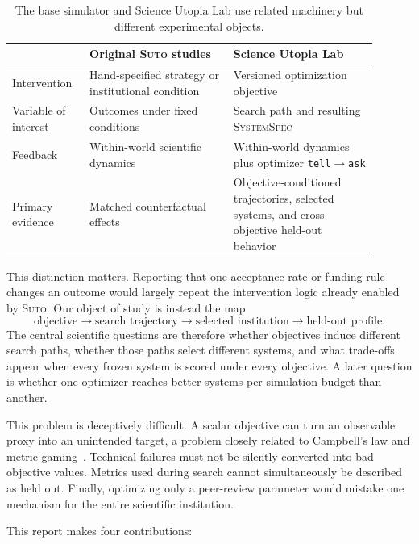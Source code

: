 \documentclass{article}
\newcommand{\systemspec}{\textsc{SystemSpec}}
\newcommand{\suto}{\textsc{Suto}}
\newcommand{\code}[1]{\texttt{#1}}
\begin{document}
\begin{table}[t]
\caption{The base simulator and Science Utopia Lab use related machinery but different experimental objects.}
\label{tab:suto-vs-lab}
\centering
\small
\begin{tabular}{p{0.18\linewidth}p{0.36\linewidth}p{0.36\linewidth}}
\toprule
 & Original \suto{} studies & Science Utopia Lab \\
\midrule
Intervention & Hand-specified strategy or institutional condition & Versioned optimization objective \\
Variable of interest & Outcomes under fixed conditions & Search path and resulting \systemspec{} \\
Feedback & Within-world scientific dynamics & Within-world dynamics plus optimizer \code{tell}$\rightarrow$\code{ask} \\
Primary evidence & Matched counterfactual effects & Objective-conditioned trajectories, selected systems, and cross-objective held-out behavior \\
\bottomrule
\end{tabular}
\end{table}

This distinction matters. Reporting that one acceptance rate or funding rule changes an outcome would largely repeat the intervention logic already enabled by \suto{}. Our object of study is instead the map
\begin{equation}
    \text{objective} \longrightarrow \text{search trajectory} \longrightarrow \text{selected institution} \longrightarrow \text{held-out profile}.
\end{equation}
The central scientific questions are therefore whether objectives induce different search paths, whether those paths select different systems, and what trade-offs appear when every frozen system is scored under every objective. A later question is whether one optimizer reaches better systems per simulation budget than another.

This problem is deceptively difficult. A scalar objective can turn an observable proxy into an unintended target, a problem closely related to Campbell's law and metric gaming~\citep{campbell1979assessing,fire2019overoptimization}. Technical failures must not be silently converted into bad objective values. Metrics used during search cannot simultaneously be described as held out. Finally, optimizing only a peer-review parameter would mistake one mechanism for the entire scientific institution.

This report makes four contributions:
\end{document}
